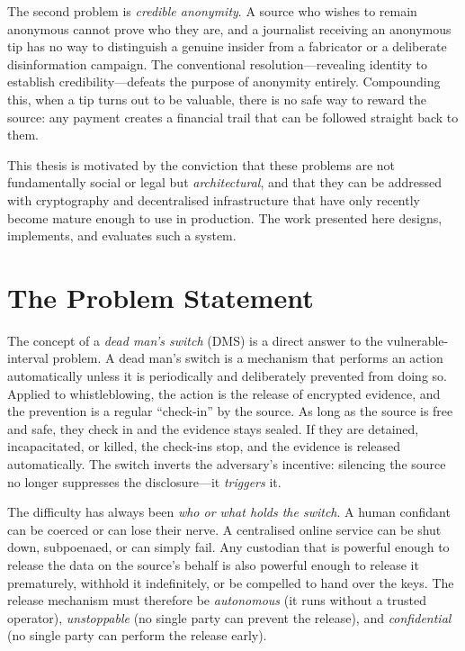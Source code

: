 The second problem is \emph{credible anonymity}. A source who wishes to remain
anonymous cannot prove who they are, and a journalist receiving an anonymous tip
has no way to distinguish a genuine insider from a fabricator or a deliberate
disinformation campaign. The conventional resolution---revealing identity to
establish credibility---defeats the purpose of anonymity entirely. Compounding
this, when a tip turns out to be valuable, there is no safe way to reward the
source: any payment creates a financial trail that can be followed straight back
to them.

This thesis is motivated by the conviction that these problems are not
fundamentally social or legal but \emph{architectural}, and that they can be
addressed with cryptography and decentralised infrastructure that have only
recently become mature enough to use in production. The work presented here
designs, implements, and evaluates such a system.

\section{The Problem Statement}
\label{sec:intro-problem}

The concept of a \emph{dead man's switch} (DMS) is a direct answer to the
vulnerable-interval problem. A dead man's switch is a mechanism that performs an
action automatically unless it is periodically and deliberately prevented from
doing so. Applied to whistleblowing, the action is the release of encrypted
evidence, and the prevention is a regular ``check-in'' by the source. As long as
the source is free and safe, they check in and the evidence stays sealed. If
they are detained, incapacitated, or killed, the check-ins stop, and the
evidence is released automatically. The switch inverts the adversary's
incentive: silencing the source no longer suppresses the disclosure---it
\emph{triggers} it.

The difficulty has always been \emph{who or what holds the switch}. A human
confidant can be coerced or can lose their nerve. A centralised online service
can be shut down, subpoenaed, or can simply fail. Any custodian that is powerful
enough to release the data on the source's behalf is also powerful enough to
release it prematurely, withhold it indefinitely, or be compelled to hand over
the keys. The release mechanism must therefore be \emph{autonomous} (it runs
without a trusted operator), \emph{unstoppable} (no single party can prevent the
release), and \emph{confidential} (no single party can perform the release
early).

